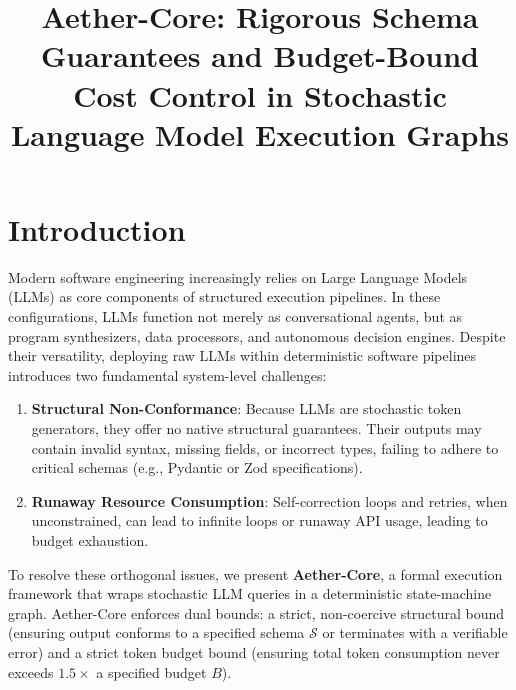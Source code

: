 \documentclass[10pt,journal,compsoc]{IEEEtran}
\begin{document}
\title{Aether-Core: Rigorous Schema Guarantees and Budget-Bound Cost Control in Stochastic Language Model Execution Graphs}


\maketitle
\IEEEdisplaynontitleabstractindextext
\IEEEpeerreviewmaketitle


\newtheorem{theorem}{Theorem}

\section{Introduction}
Modern software engineering increasingly relies on Large Language Models (LLMs) as core components of structured execution pipelines. In these configurations, LLMs function not merely as conversational agents, but as program synthesizers, data processors, and autonomous decision engines. Despite their versatility, deploying raw LLMs within deterministic software pipelines introduces two fundamental system-level challenges:
\begin{enumerate}
\item \textbf{Structural Non-Conformance}: Because LLMs are stochastic token generators, they offer no native structural guarantees. Their outputs may contain invalid syntax, missing fields, or incorrect types, failing to adhere to critical schemas (e.g., Pydantic or Zod specifications).
\item \textbf{Runaway Resource Consumption}: Self-correction loops and retries, when unconstrained, can lead to infinite loops or runaway API usage, leading to budget exhaustion.
\end{enumerate}

To resolve these orthogonal issues, we present \textbf{Aether-Core}, a formal execution framework that wraps stochastic LLM queries in a deterministic state-machine graph. Aether-Core enforces dual bounds: a strict, non-coercive structural bound (ensuring output conforms to a specified schema $\mathcal{S}$ or terminates with a verifiable error) and a strict token budget bound (ensuring total token consumption never exceeds $1.5\times$ a specified budget $B$). 
\end{document}
